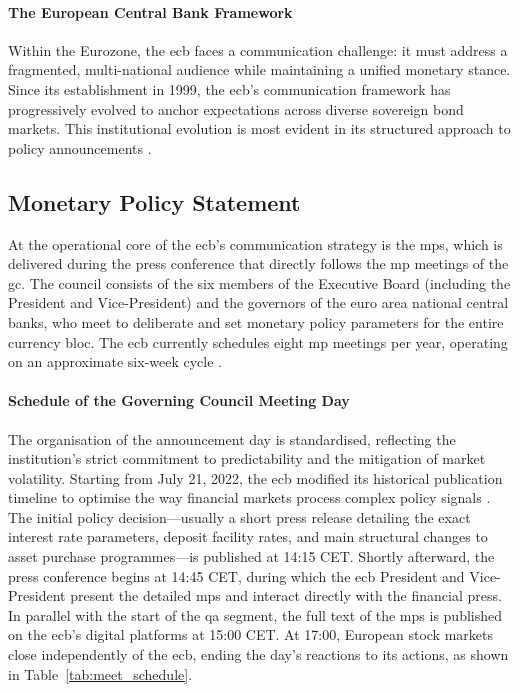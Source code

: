 \paragraph{The European Central Bank Framework}
Within the Eurozone, the \gls{ecb} faces a communication challenge: it must address a fragmented, multi-national audience while maintaining a unified monetary stance. Since its establishment in 1999, the \gls{ecb}'s communication framework has progressively evolved to anchor expectations across diverse sovereign bond markets. This institutional evolution is most evident in its structured approach to policy announcements \cite{ECB_about}.

\subsection{Monetary Policy Statement}
\label{subsection:mps}
At the operational core of the \gls{ecb}'s communication strategy is the \gls{mps}, which is delivered during the press conference that directly follows the \gls{mp} meetings of the \gls{gc}. The council consists of the six members of the Executive Board (including the President and Vice-President) and the governors of the euro area national central banks, who meet to deliberate and set monetary policy parameters for the entire currency bloc. The \gls{ecb} currently schedules eight \gls{mp} meetings per year, operating on an approximate six-week cycle \cite{ITC_ECB_Schedule}.

\paragraph{Schedule of the Governing Council Meeting Day}
The organisation of the announcement day is standardised, reflecting the institution's strict commitment to predictability and the mitigation of market volatility. Starting from July 21, 2022, the \gls{ecb} modified its historical publication timeline to optimise the way financial markets process complex policy signals \cite{ECB2022_NewTimes}. The initial policy decision---usually a short press release detailing the exact interest rate parameters, deposit facility rates, and main structural changes to asset purchase programmes---is published at 14:15 CET. Shortly afterward, the press conference begins at 14:45 CET, during which the \gls{ecb} President and Vice-President present the detailed \gls{mps} and interact directly with the financial press. In parallel with the start of the \gls{qa} segment, the full text of the \gls{mps} is published on the \gls{ecb}'s digital platforms at 15:00 CET. At 17:00, European stock markets close independently of the \gls{ecb}, ending the day's reactions to its actions, as shown in Table~\ref{tab:meet_schedule}.

